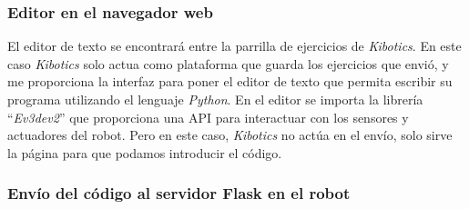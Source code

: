 \subsubsection{Editor en el navegador web}

El editor de texto se encontrará entre la parrilla de ejercicios de \textit{Kibotics}. En este caso \textit{Kibotics} solo actua como plataforma que guarda los ejercicios que envió, y me proporciona la interfaz para poner el editor de texto que permita escribir su programa utilizando el lenguaje \textit{Python}. En el editor se importa la librería “\textit{Ev3dev2}”  que proporciona una API para interactuar con los sensores y actuadores del robot. Pero en este caso, \textit{Kibotics} no actúa en el envío, solo sirve la página para que podamos introducir el código.

\subsubsection{Envío del código al servidor Flask en el robot}

